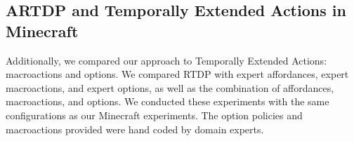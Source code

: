 \documentclass[conference]{IEEEtran}
\begin{document}


\subsection{ARTDP and Temporally Extended Actions in Minecraft}
Additionally, we compared our approach to Temporally Extended Actions: 
macroactions and options. We compared RTDP with expert affordances, 
expert macroactions, and expert options, as well as the combination of 
affordances, macroactions, and options. We conducted these experiments 
with the same configurations as our Minecraft experiments. The option policies
and macroactions provided were hand coded by domain experts.
\end{document}
